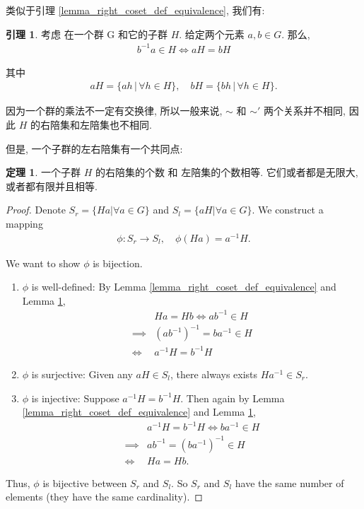 \documentclass[utf8]{ctexbook}
\theoremstyle{definition}
\newtheorem{prototheorem}{定理}[section]
\newenvironment{theorem}
   {\colorlet{shadecolor}{red!30}\begin{shaded}\begin{prototheorem}}
   {\end{prototheorem}\end{shaded}}
\newtheorem{lemma}{引理}[section]
\begin{document}
类似于引理 \ref{lemma_right_coset_def_equivalence}, 我们有:

\begin{lemma}\label{lemma_left_coset_def_equivalence}
考虑 在一个群 G 和它的子群 $H$. 给定两个元素 $a, b \in G$. 那么,
\begin{align*}
 b^{-1} a \in H \iff aH = bH 
\end{align*}

其中
\begin{align*}
aH = \{ ah \, | \, \forall h \in H \} , \quad bH = \{ bh \, | \, \forall h \in H \} .
\end{align*}

\end{lemma}

因为一个群的乘法不一定有交换律, 所以一般来说, $\sim$ 和 $\sim'$ 两个关系并不相同, 因此 $H$ 的右陪集和左陪集也不相同.

但是, 一个子群的左右陪集有一个共同点:
\begin{theorem}\label{thm_left_right_coset}
一个子群 $H$ 的右陪集的个数 和 左陪集的个数相等. 它们或者都是无限大, 或者都有限并且相等.
\end{theorem}

\begin{proof}
Denote $S_r =\{ Ha | \forall a \in G \}$ and $S_l = \{ a H | \forall a \in G \}$. We construct a mapping
\begin{align*}
\phi: S_r \longrightarrow S_l, \quad \phi( Ha ) =  a^{-1} H .
\end{align*}

We want to show $\phi$ is bijection.

\begin{enumerate}
\item{$\phi$ is well-defined: By Lemma \ref{lemma_right_coset_def_equivalence} and Lemma \ref{lemma_left_coset_def_equivalence}, 
\begin{align*}
& Ha = Hb \iff a b^{-1}  \in H \\
\implies & (a b^{-1})^{-1} = b a^{-1} \in H \\
\iff & a^{-1} H = b^{-1} H
\end{align*}
}
\item{$\phi$ is surjective: Given any $aH \in S_l$, there always exists $Ha^{-1} \in S_r$.}
\item{$\phi$ is injective: Suppose $a^{-1} H = b^{-1} H$. Then again by Lemma \ref{lemma_right_coset_def_equivalence} and Lemma \ref{lemma_left_coset_def_equivalence},
\begin{align*}
& a^{-1} H = b^{-1} H \iff b a^{-1} \in H \\
\implies & ab^{-1} = (b a^{-1} )^{-1} \in H \\
\iff & Ha = Hb .
\end{align*}
}
\end{enumerate}

Thus, $\phi$ is bijective between $S_r$ and $S_l$. So $S_r$ and $S_l$ have the same number of elements (they have the same cardinality).

\end{proof}
\end{document}
